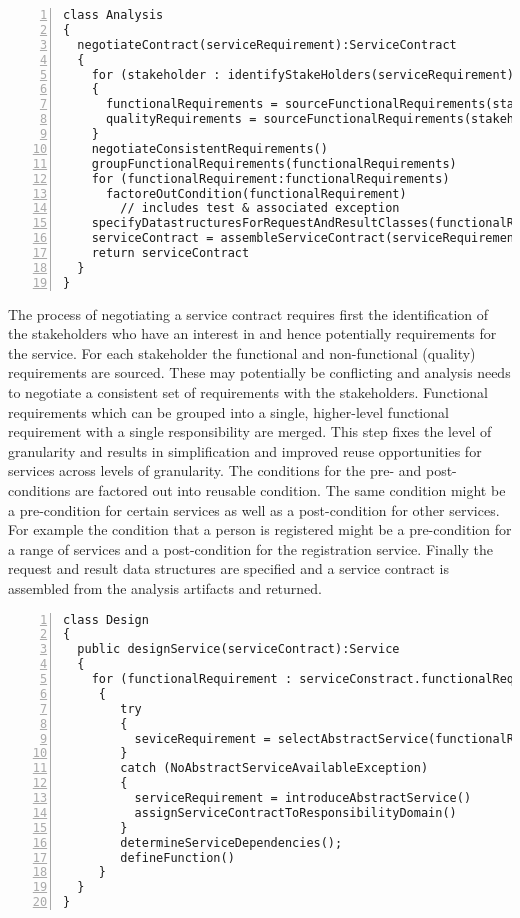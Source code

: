 \lstset{language=pseudoCode,caption=The analysis phase of the URDAD process.,label=urdadAnalysis}
\begin{lstlisting}[numbers=left,escapechar=|]
class Analysis
{
  negotiateContract(serviceRequirement):ServiceContract
  {
    for (stakeholder : identifyStakeHolders(serviceRequirement))
    {
      functionalRequirements = sourceFunctionalRequirements(stakeholder, serviceRequirement)
      qualityRequirements = sourceFunctionalRequirements(stakeholder, serviceRequirement)
    }
    negotiateConsistentRequirements()
    groupFunctionalRequirements(functionalRequirements)
    for (functionalRequirement:functionalRequirements)
      factoreOutCondition(functionalRequirement)
        // includes test & associated exception
    specifyDatastructuresForRequestAndResultClasses(functionalRequirements)
    serviceContract = assembleServiceContract(serviceRequirement.serviceName, serviceRequirement.responsibilityDomain, functionalRequirements, qualityRequirements, requestClass, resultClass);
    return serviceContract
  }
}
\end{lstlisting}

The process of negotiating a service contract requires first the identification of the stakeholders who have an interest in and hence potentially requirements for the service. For each stakeholder the functional and non-functional (quality) requirements are sourced. These may potentially be conflicting and analysis needs to negotiate a consistent set of requirements with the stakeholders. Functional requirements which can be grouped into a single, higher-level functional requirement with a single responsibility are merged. This step fixes the level of granularity and results in simplification and improved reuse opportunities for services across levels of granularity. The conditions for the pre- and post-conditions are factored out into reusable condition. The same condition might be a pre-condition for certain services as well as a post-condition for other services. For example the condition that a person is registered might be a pre-condition for a range of services and a post-condition for the registration service. Finally the request and result data structures are specified and a service contract is assembled from the analysis artifacts and returned.

\lstset{language=pseudoCode,caption=The analysis phase of the URDAD process.,label=urdadDesign}
\begin{lstlisting}[numbers=left,escapechar=|]
class Design
{
  public designService(serviceContract):Service
  {
    for (functionalRequirement : serviceConstract.functionalRequirements)
	 {
		try
		{
		  seviceRequirement = selectAbstractService(functionalRequirement)
		}
		catch (NoAbstractServiceAvailableException)
		{
		  serviceRequirement = introduceAbstractService()
		  assignServiceContractToResponsibilityDomain()
		}
		determineServiceDependencies();
		defineFunction()
	 }
  }
}
\end{lstlisting}


